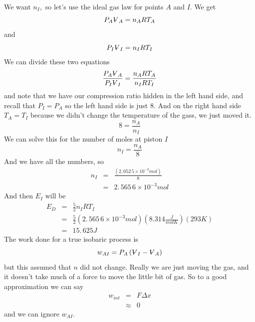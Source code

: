\documentclass{article}
\begin{document}
We want $n_{I},$ so let's use the ideal gas law for points $A$ and $I.$ We
get 
\[
P_{A}%
\ooalign{\hfil$V$\hfil\cr\kern0.1em--\hfil\cr}%
_{A}=n_{A}RT_{A}
\]%
and 
\[
P_{I}%
\ooalign{\hfil$V$\hfil\cr\kern0.1em--\hfil\cr}%
_{I}=n_{I}RT_{I}
\]%
We can divide these two equations%
\[
\frac{P_{A}%
\ooalign{\hfil$V$\hfil\cr\kern0.1em--\hfil\cr}%
_{A}}{P_{I}%
\ooalign{\hfil$V$\hfil\cr\kern0.1em--\hfil\cr}%
_{I}}=\frac{n_{A}RT_{A}}{n_{I}RT_{I}}
\]%
and note that we have our compression ratio hidden in the left hand side,
and recall that $P_{I}=P_{A}$ so the left hand side is just $8.$ And on the
right hand side $T_{A}=T_{I}$ because we didn't change the temperature of
the gass, we just moved it. 
\[
8=\frac{n_{A}}{n_{I}}
\]%
We can solve this for the number of moles at piston $I$%
\[
n_{I}=\frac{n_{A}}{8}
\]%
And we have all the numbers, so 
\begin{eqnarray*}
n_{I} &=&\frac{\left( 2.\,052\,5\times 10^{-2}\unit{mol}\right) }{8} \\
&=&\allowbreak 2.\,\allowbreak 565\,6\times 10^{-3}\unit{mol}
\end{eqnarray*}%
And then $E_{I}$ will be 
\begin{eqnarray*}
E_{D} &=&\frac{5}{2}n_{I}RT_{I} \\
&=&\frac{5}{2}\left( 2.\,\allowbreak 565\,6\times 10^{-3}\unit{mol}\right)
\left( 8.314\frac{\unit{J}}{\unit{mol}\unit{K}}\right) \left( 293\unit{K}%
\right)  \\
&=&15.\,\allowbreak 625\unit{J}
\end{eqnarray*}%
The work done for a true isobaric process is 
\[
w_{AI}=P_{A}\left( 
\ooalign{\hfil$V$\hfil\cr\kern0.1em--\hfil\cr}%
_{I}-%
\ooalign{\hfil$V$\hfil\cr\kern0.1em--\hfil\cr}%
_{A}\right) 
\]%
but this assumed that $n$ did not change. Really we are just moving the gas,
and it doesn't take much of a force to move the little bit of gas. So to a
good approximation we can say 
\begin{eqnarray*}
w_{int} &=&F\Delta x \\
&\approx &0
\end{eqnarray*}%
and we can ignore $w_{AI}.$
\end{document}
